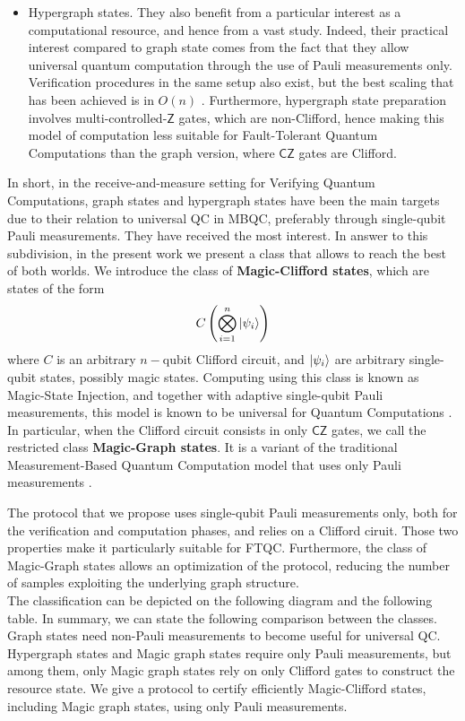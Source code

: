 \documentclass[11pt]{article}
\newcommand{\concept}[1]{\textcolor{importantclr}{\textsf{\textbf{#1}}}}
\newcommand{\CZ}{\mathsf{CZ}}
\newcommand{\Z}{\mathsf{Z}}
\begin{document}
\begin{itemize}
    \item Hypergraph states. They also benefit from a particular interest as a computational resource, and hence from a vast study. Indeed, their practical interest compared to graph state comes from the fact that they allow universal quantum computation through the use of Pauli measurements only. Verification procedures in the same setup also exist, but the best scaling that has been achieved is in $O(n)$ \cite{ZH18efficient}. Furthermore, hypergraph state preparation involves multi-controlled-$\Z$ gates, which are non-Clifford, hence making this model of computation less suitable for Fault-Tolerant Quantum Computations than the graph version, where $\CZ$ gates are Clifford.
\end{itemize}

In short, in the receive-and-measure setting for Verifying Quantum Computations, graph states and hypergraph states have been the main targets due to their relation to universal QC in MBQC, preferably through single-qubit Pauli measurements. They have received the most interest. In answer to this subdivision, in the present work we present a class that allows to reach the best of both worlds. We introduce the class of \concept{Magic-Clifford states}, which are states of the form
\[
    C\left(
        \bigotimes_{i=1}^n \ket{\psi_i}
    \right)    
\]
where $C$ is an arbitrary $n-$qubit Clifford circuit, and $\ket{\psi_i}$ are arbitrary single-qubit states, possibly magic states. Computing using this class is known as Magic-State Injection, and together with adaptive single-qubit Pauli measurements, this model is known to be universal for Quantum Computations  \cite{BK04universal}.
In particular, when the Clifford circuit consists in only $\CZ$ gates, we call the restricted class \concept{Magic-Graph states}. It is a variant of the traditional Measurement-Based Quantum Computation model that uses only Pauli measurements \cite{SDKO07direct}. 

The protocol that we propose uses single-qubit Pauli measurements only, both for the verification and computation phases,  and relies on a Clifford ciruit. Those two properties make it particularly suitable for FTQC. Furthermore, the class of Magic-Graph states allows an optimization of the protocol, reducing the number of samples exploiting the underlying graph structure.\\

The classification can be depicted on the following diagram and the following table. In summary, we can state the following comparison between the classes.
Graph states need non-Pauli measurements to become useful for universal QC. Hypergraph states and Magic graph states require only Pauli measurements, but among them, only Magic graph states rely on only Clifford gates to construct the resource state. We give a protocol to certify efficiently Magic-Clifford states, including Magic graph states, using only Pauli measurements.
\end{document}
